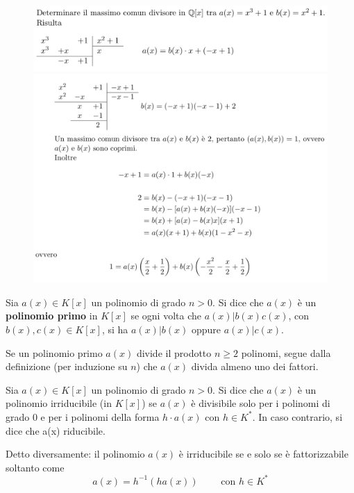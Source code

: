 \documentclass[a4paper,12pt, oneside]{book}
\begin{document}
			\begin{shaded}
				\begin{esempio}
				\end{esempio}
				\begin{figure}[H]
					\includegraphics[width=\linewidth,scale=1]{polydiv2}
					\includegraphics[width=\linewidth,scale=1]{polydiv3}
				\end{figure}	
			\end{shaded}
			
			\begin{definizione}
				Sia $a(x) \in K[x]$ un polinomio di grado $n > 0$. Si dice che $a(x)$ è un \textbf{polinomio primo} in $K[x]$ se ogni volta che $a(x) | b(x)c(x)$, con $b(x),c(x) \in K[x]$, si ha $a(x) | b(x)$ oppure $a(x) | c(x)$.
			\end{definizione}
			
			\begin{osservazione}
				Se un polinomio primo $a(x)$ divide il prodotto $n \geq 2$ polinomi, segue dalla definizione (per induzione su $n$) che $a(x)$ divida almeno uno dei fattori.
			\end{osservazione}
			
			\begin{definizione}
				Sia $a(x) \in K[x]$ un polinomio di grado $n>0$. Si dice che $a(x)$ è un polinomio irriducibile (in $K[x]$) se $a(x)$ è divisibile solo per i polinomi di grado $0$ e per i polinomi della forma $h \cdot a(x)$ con $h \in K^{*}$. In caso contrario, si dice che a(x) riducibile.
				
				Detto diversamente: il polinomio $a(x)$ è irriducibile se e solo se è fattorizzabile soltanto come
				$$a(x) = h^{-1}(ha(x)) \qquad \mbox{ con } h \in K^{*}$$
			\end{definizione}
			
\end{document}
